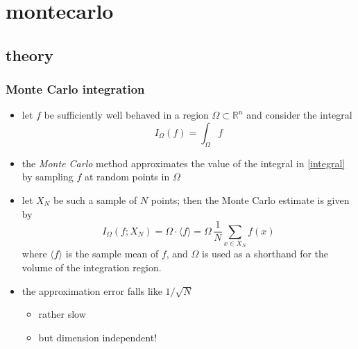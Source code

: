 %
%


\section{montecarlo}
\subsection{theory}

\begin{frame}
%
  \frametitle{Monte Carlo integration}
%
  \begin{itemize}
%
  \item let $f$ be sufficiently well behaved in a region $\Omega \subset \mathbb{R}^{n}$ and
    consider the integral
    \begin{equation}
      I_{\Omega} (f) = \int_{\Omega} f 
      \label{eq:integral}
    \end{equation}
%
  \item the {\em Monte Carlo} method approximates the value of the integral in \eqref{integral}
    by sampling $f$ at random points in $\Omega$
%
  \item let $X_{N}$ be such a sample of $N$ points; then the Monte Carlo estimate is given by
    \begin{equation}
      I_{\Omega} (f; X_{N})
      =
      \Omega \cdot \langle f \rangle
      =
      \Omega \, \frac{1}{N} \sum_{x \in X_{N}} f(x)
      \label{eq:mc-estimate}
    \end{equation}
%
    where $\langle f \rangle$ is the sample mean of $f$, and $\Omega$ is used as a shorthand
    for the volume of the integration region.
%
  \item the approximation error falls like $1/\sqrt{N}$
    \begin{itemize}
    \item rather slow
    \item but dimension independent!
    \end{itemize}
  \end{itemize}
%
\end{frame}

